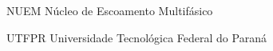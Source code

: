 \begin{siglas}

   \item[NUEM] Núcleo de Escoamento Multifásico
   \item[UTFPR] Universidade Tecnológica Federal do Paraná
   

\end{siglas}
